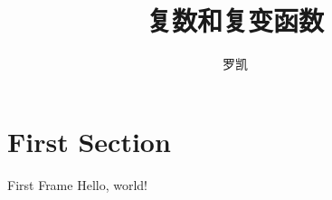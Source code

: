 \documentclass[fontset=windows]{beamer}
\title{复数和复变函数}
\author{罗凯}
\institute{南京理工大学物理学院}
\begin{document}
  \maketitle

  
  \section{First Section}
  \begin{frame}{First Frame}
    Hello, world!
  \end{frame}
\end{document}
